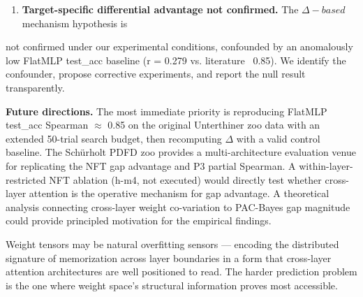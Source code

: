 \begin{enumerate}
\item \textbf{Target-specific differential advantage not confirmed.} The $\Delta -based$ mechanism hypothesis is
\end{enumerate}
   not confirmed under our experimental conditions, confounded by an anomalously low FlatMLP
   test\_acc baseline (r = 0.279 vs. literature ~0.85). We identify the confounder, propose
   corrective experiments, and report the null result transparently.

\textbf{Future directions.} The most immediate priority is reproducing FlatMLP test\_acc Spearman $\approx$ 0.85
on the original Unterthiner zoo data with an extended 50-trial search budget, then recomputing $\Delta$
with a valid control baseline. The Schürholt PDFD zoo provides a multi-architecture evaluation venue
for replicating the NFT gap advantage and P3 partial Spearman. A within-layer-restricted NFT ablation
(h-m4, not executed) would directly test whether cross-layer attention is the operative mechanism
for gap advantage. A theoretical analysis connecting cross-layer weight co-variation to PAC-Bayes
gap magnitude could provide principled motivation for the empirical findings.

Weight tensors may be natural overfitting sensors --- encoding the distributed signature of
memorization across layer boundaries in a form that cross-layer attention architectures are well
positioned to read. The harder prediction problem is the one where weight space's structural
information proves most accessible.

